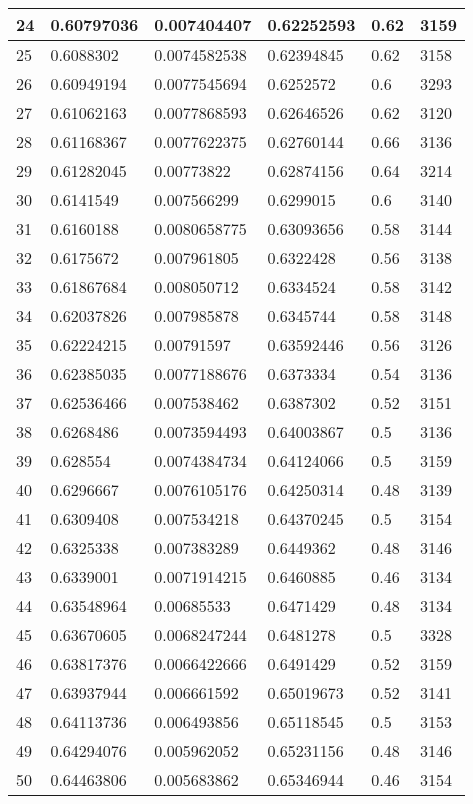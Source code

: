 \begin{longtable}{|l|l|l|l|l|l|}
24 & 0.60797036 & 0.007404407 & 0.62252593 & 0.62 & 3159 \\ \hline 
25 & 0.6088302 & 0.0074582538 & 0.62394845 & 0.62 & 3158 \\ \hline 
26 & 0.60949194 & 0.0077545694 & 0.6252572 & 0.6 & 3293 \\ \hline 
27 & 0.61062163 & 0.0077868593 & 0.62646526 & 0.62 & 3120 \\ \hline 
28 & 0.61168367 & 0.0077622375 & 0.62760144 & 0.66 & 3136 \\ \hline 
29 & 0.61282045 & 0.00773822 & 0.62874156 & 0.64 & 3214 \\ \hline 
30 & 0.6141549 & 0.007566299 & 0.6299015 & 0.6 & 3140 \\ \hline 
31 & 0.6160188 & 0.0080658775 & 0.63093656 & 0.58 & 3144 \\ \hline 
32 & 0.6175672 & 0.007961805 & 0.6322428 & 0.56 & 3138 \\ \hline 
33 & 0.61867684 & 0.008050712 & 0.6334524 & 0.58 & 3142 \\ \hline 
34 & 0.62037826 & 0.007985878 & 0.6345744 & 0.58 & 3148 \\ \hline 
35 & 0.62224215 & 0.00791597 & 0.63592446 & 0.56 & 3126 \\ \hline 
36 & 0.62385035 & 0.0077188676 & 0.6373334 & 0.54 & 3136 \\ \hline 
37 & 0.62536466 & 0.007538462 & 0.6387302 & 0.52 & 3151 \\ \hline 
38 & 0.6268486 & 0.0073594493 & 0.64003867 & 0.5 & 3136 \\ \hline 
39 & 0.628554 & 0.0074384734 & 0.64124066 & 0.5 & 3159 \\ \hline 
40 & 0.6296667 & 0.0076105176 & 0.64250314 & 0.48 & 3139 \\ \hline 
41 & 0.6309408 & 0.007534218 & 0.64370245 & 0.5 & 3154 \\ \hline 
42 & 0.6325338 & 0.007383289 & 0.6449362 & 0.48 & 3146 \\ \hline 
43 & 0.6339001 & 0.0071914215 & 0.6460885 & 0.46 & 3134 \\ \hline 
44 & 0.63548964 & 0.00685533 & 0.6471429 & 0.48 & 3134 \\ \hline 
45 & 0.63670605 & 0.0068247244 & 0.6481278 & 0.5 & 3328 \\ \hline 
46 & 0.63817376 & 0.0066422666 & 0.6491429 & 0.52 & 3159 \\ \hline 
47 & 0.63937944 & 0.006661592 & 0.65019673 & 0.52 & 3141 \\ \hline 
48 & 0.64113736 & 0.006493856 & 0.65118545 & 0.5 & 3153 \\ \hline 
49 & 0.64294076 & 0.005962052 & 0.65231156 & 0.48 & 3146 \\ \hline 
50 & 0.64463806 & 0.005683862 & 0.65346944 & 0.46 & 3154 \\ \hline 
\end{longtable}